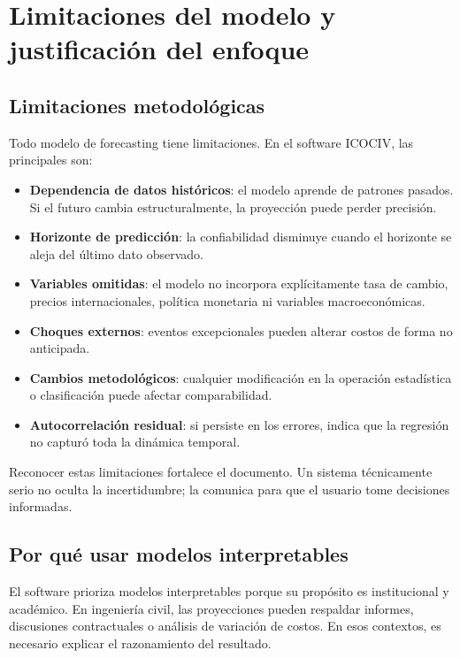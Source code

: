 \section{Limitaciones del modelo y justificación del enfoque}

\subsection{Limitaciones metodológicas}

Todo modelo de forecasting tiene limitaciones. En el software ICOCIV, las principales son:

\begin{itemize}
    \item \textbf{Dependencia de datos históricos}: el modelo aprende de patrones pasados. Si el futuro cambia estructuralmente, la proyección puede perder precisión.
    \item \textbf{Horizonte de predicción}: la confiabilidad disminuye cuando el horizonte se aleja del último dato observado.
    \item \textbf{Variables omitidas}: el modelo no incorpora explícitamente tasa de cambio, precios internacionales, política monetaria ni variables macroeconómicas.
    \item \textbf{Choques externos}: eventos excepcionales pueden alterar costos de forma no anticipada.
    \item \textbf{Cambios metodológicos}: cualquier modificación en la operación estadística o clasificación puede afectar comparabilidad.
    \item \textbf{Autocorrelación residual}: si persiste en los errores, indica que la regresión no capturó toda la dinámica temporal.
\end{itemize}

Reconocer estas limitaciones fortalece el documento. Un sistema técnicamente serio no oculta la incertidumbre; la comunica para que el usuario tome decisiones informadas.

\subsection{Por qué usar modelos interpretables}

El software prioriza modelos interpretables porque su propósito es institucional y académico. En ingeniería civil, las proyecciones pueden respaldar informes, discusiones contractuales o análisis de variación de costos. En esos contextos, es necesario explicar el razonamiento del resultado.

